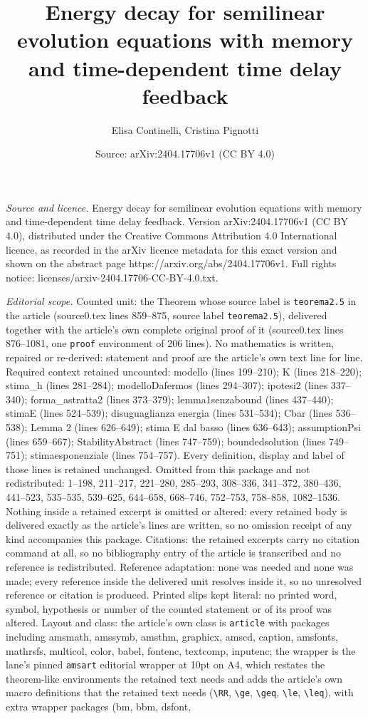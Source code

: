\documentclass[10pt,a4paper]{amsart}
\title[Energy decay for semilinear evolution equations with memory ]{Energy decay for semilinear evolution equations with memory and time-dependent time delay feedback}
\author{Elisa Continelli, Cristina Pignotti}
\date{Source: arXiv:2404.17706v1 (CC BY 4.0)}
\begin{document}
\maketitle

\noindent\emph{Source and licence.} Energy decay for semilinear evolution equations with memory and time-dependent time delay feedback. Version arXiv:2404.17706v1 (CC BY 4.0), distributed under the Creative Commons Attribution 4.0 International licence, as recorded in the arXiv licence metadata for this exact version and shown on the abstract page https://arxiv.org/abs/2404.17706v1. Full rights notice: licenses/arxiv-2404.17706-CC-BY-4.0.txt.\par\smallskip

\noindent\textit{Editorial scope.} Counted unit: the Theorem whose source label is \texttt{teorema2.5} in the article (source0.tex lines 859--875, source label \texttt{teorema2.5}), delivered together with the article's own complete original proof of it (source0.tex lines 876--1081, one \texttt{proof} environment of 206 lines). No mathematics is written, repaired or re-derived: statement and proof are the article's own text line for line. Required context retained uncounted: modello (lines 199--210); K (lines 218--220); stima\_h (lines 281--284); modelloDafermos (lines 294--307); ipotesi2 (lines 337--340); forma\_astratta2 (lines 373--379); lemma1senzabound (lines 437--440); stimaE (lines 524--539); disuguaglianza energia (lines 531--534); Cbar (lines 536--538); Lemma 2 (lines 626--649); stima E dal basso (lines 636--643); assumptionPsi (lines 659--667); StabilityAbstract (lines 747--759); boundedsolution (lines 749--751); stimaesponenziale (lines 754--757). Every definition, display and label of those lines is retained unchanged. Omitted from this package and not redistributed: 1--198, 211--217, 221--280, 285--293, 308--336, 341--372, 380--436, 441--523, 535--535, 539--625, 644--658, 668--746, 752--753, 758--858, 1082--1536. Nothing inside a retained excerpt is omitted or altered: every retained body is delivered exactly as the article's lines are written, so no omission receipt of any kind accompanies this package. Citations: the retained excerpts carry no citation command at all, so no bibliography entry of the article is transcribed and no reference is redistributed. Reference adaptation: none was needed and none was made; every reference inside the delivered unit resolves inside it, so no unresolved reference or citation is produced. Printed slips kept literal: no printed word, symbol, hypothesis or number of the counted statement or of its proof was altered. Layout and class: the article's own class is \texttt{article} with packages including amsmath, amssymb, amsthm, graphicx, amscd, caption, amsfonts, mathrsfs, multicol, color, babel, fontenc, textcomp, inputenc; the wrapper is the lane's pinned \texttt{amsart} editorial wrapper at 10pt on A4, which restates the theorem-like environments the retained text needs and adds the article's own macro definitions that the retained text needs (\texttt{\textbackslash RR}, \texttt{\textbackslash ge}, \texttt{\textbackslash geq}, \texttt{\textbackslash le}, \texttt{\textbackslash leq}), with extra wrapper packages (bm, bbm, dsfont, 
\end{document}
